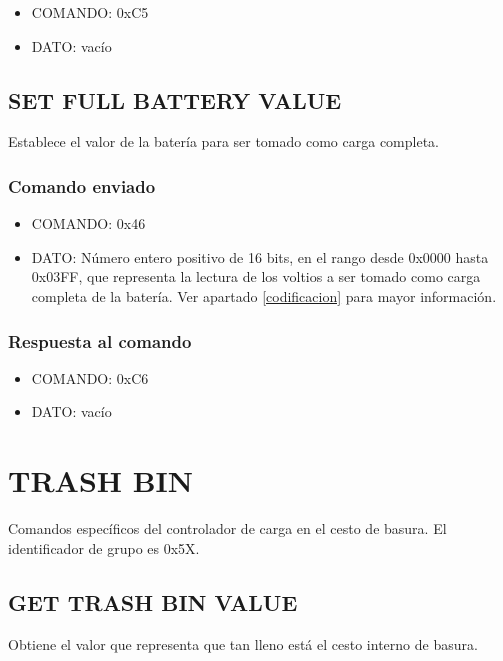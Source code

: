 \documentclass[a4paper,10pt]{article}
\begin{document}
\begin{itemize}
	\item{COMANDO:} 0xC5
	\item{DATO:} vac\'io
\end{itemize}

\subsection{SET FULL BATTERY VALUE}
\label{set_battery_empty_value}

Establece el valor de la bater\'ia para ser tomado como carga completa.

\subsubsection*{Comando enviado}

\begin{itemize}
	\item{COMANDO:} 0x46
	\item{DATO:} N\'umero entero positivo de 16 bits, en el rango desde 0x0000 hasta 0x03FF,
		que representa la lectura de los voltios a ser tomado como carga completa de la bater\'ia.
		Ver apartado \ref{codificacion} para mayor informaci\'on.
\end{itemize}

\subsubsection*{Respuesta al comando}

\begin{itemize}
	\item{COMANDO:} 0xC6
	\item{DATO:} vac\'io
\end{itemize}

\section{TRASH BIN}
\label{grupo_trash_bin}

Comandos espec\'ificos del controlador de carga en el cesto de basura.
El identificador de grupo es 0x5X.

\subsection{GET TRASH BIN VALUE}
\label{get_trash_bin_value}

Obtiene el valor que representa que tan lleno est\'a el cesto interno de basura.
\end{document}
